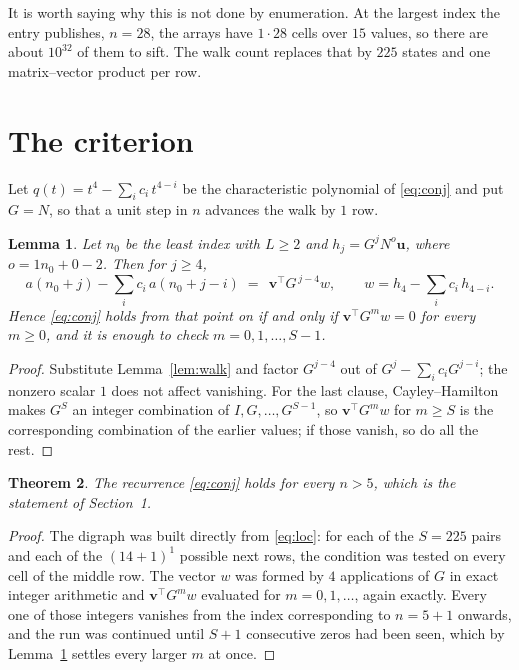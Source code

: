 \documentclass[11pt,a4paper]{article}
\theoremstyle{plain}
\newtheorem{theorem}{Theorem}
\newtheorem{lemma}[theorem]{Lemma}
\theoremstyle{definition}
\begin{document}
It is worth saying why this is not done by enumeration. At the largest index the entry
publishes, $n=28$, the arrays have $1\cdot28$ cells over
$15$ values, so there are about $10^{32}$ of them to sift. The
walk count replaces that by $225$ states and one matrix--vector product per row.
\section{The criterion}

Let $q(t)=t^{4}-\sum_i c_i\,t^{4-i}$ be the characteristic polynomial of
\eqref{eq:conj} and put $G=N$, so that a unit step in $n$ advances the walk by
$1$ row.

\begin{lemma}\label{lem:crit}
Let $n_0$ be the least index with $L\ge2$ and $h_j=G^{j}N^{o}\mathbf{u}$, where
$o=1n_0+0-2$. Then for $j\ge4$,
\[
a(n_0+j)-\sum_i c_i\,a(n_0+j-i)\;=\;\,\mathbf{v}^{\!\top}G^{\,j-4}w,
\qquad w=h_{4}-\sum_i c_i\,h_{4-i} .
\]
Hence \eqref{eq:conj} holds from that point on if and only if
$\mathbf{v}^{\!\top}G^{m}w=0$ for every $m\ge0$, and it is enough to check
$m=0,1,\dots,S-1$.
\end{lemma}

\begin{proof}
Substitute Lemma~\ref{lem:walk} and factor $G^{j-4}$ out of
$G^{j}-\sum_ic_iG^{j-i}$; the nonzero scalar $1$ does not affect
vanishing. For the last clause, Cayley--Hamilton makes $G^{S}$ an integer combination of
$I,G,\dots,G^{S-1}$, so $\mathbf{v}^{\!\top}G^{m}w$ for $m\ge S$ is the corresponding
combination of the earlier values; if those vanish, so do all the rest.
\end{proof}

\begin{theorem}
The recurrence \eqref{eq:conj} holds for every $n>5$, which is the statement of
Section~1.
\end{theorem}

\begin{proof}
The digraph was built directly from \eqref{eq:loc}: for each of the $S=225$ pairs and each
of the $(14+1)^{1}$ possible next rows, the condition was tested on every cell of
the middle row. The vector $w$ was formed by $4$ applications of $G$ in exact integer
arithmetic and $\mathbf{v}^{\!\top}G^{m}w$ evaluated for $m=0,1,\dots$, again exactly.
Every one of those integers vanishes from the index corresponding to $n=5+1$ onwards,
and the run was continued until $S+1$ consecutive zeros had been seen, which by
Lemma~\ref{lem:crit} settles every larger $m$ at once.
\end{proof}
\end{document}
